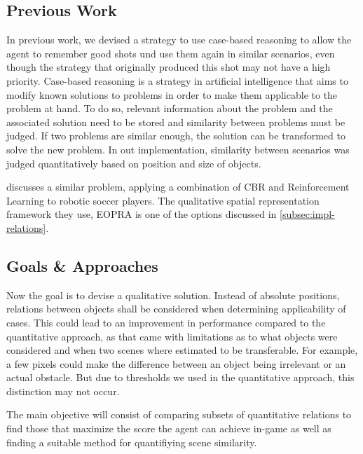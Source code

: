 \subsection{Previous Work}
In previous work, we devised a strategy to use case-based reasoning to allow the agent to remember good shots und use them again in similar scenarios, even though the strategy that originally produced this shot may not have a high priority.
Case-based reasoning is a strategy in artificial intelligence that aims to modify known solutions to problems in order to make them applicable to the problem at hand.
To do so, relevant information about the problem and the associated solution need to be stored and similarity between problems must be judged.
If two problems are similar enough, the solution can be transformed to solve the new problem.
In out implementation, similarity between scenarios was judged quantitatively based on position and size of objects.

\cite{QCBR} discusses a similar problem, applying a combination of \ac{CBR} and Reinforcement Learning to robotic soccer players.
The qualitative spatial representation framework they use, \ac{EOPRA} is one of the options discussed in \ref{subsec:impl-relations}.



\subsection{Goals \& Approaches}

Now the goal is to devise a qualitative solution.
Instead of absolute positions, relations between objects shall be considered when determining applicability of cases.
This could lead to an improvement in performance compared to the quantitative approach, as that came with limitations as to what objects were considered and when two scenes where estimated to be transferable. %
For example, a few pixels could make the difference between an object being irrelevant or an actual obstacle.
But due to thresholds we used in the quantitative approach, this distinction may not occur. %

The main objective will consist of comparing subsets of quantitative relations to find those that maximize the score the agent can achieve in-game as well as finding a suitable method for quantifiying scene similarity.

